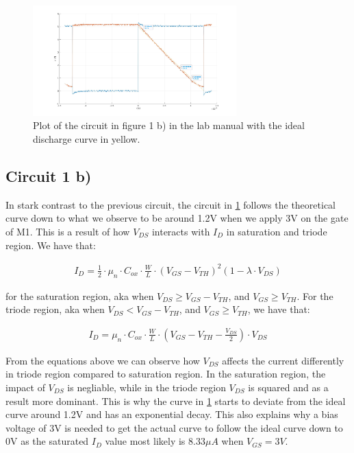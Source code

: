 \documentclass[onecolumn]{article}
\begin{document}
\clearpage

\begin{figure}[h!]
    \centering
    \includegraphics[width=0.7\textwidth]{1b.jpg}
    \caption{Plot of the circuit in figure 1 b) in the lab manual with the ideal discharge curve in yellow.}
    \label{fig:task1b}
\end{figure}


\subsection{Circuit 1 b)}
In stark contrast to the previous circuit, the circuit in \ref{fig:task1b} follows the theoretical curve down to what we observe to be around 1.2V when we apply 3V on the gate of M1. This is a result of how $V_{DS}$ interacts with $I_D$ in saturation and triode region. We have that:

\begin{align}
    I_D = \frac{1}{2} \cdot \mu_n \cdot C_{ox} \cdot \frac{W}{L} \cdot (V_{GS} - V_{TH})^2(1 - \lambda \cdot V_{DS})
\end{align}

for the saturation region, aka when $V_{DS} \geq V_{GS} - V_{TH}$, and $V_{GS} \geq V_{TH}$. For the triode region, aka when $V_{DS} < V_{GS} - V_{TH}$, and $V_{GS} \geq V_{TH}$, we have that:

\begin{align}
    I_D = \mu_n \cdot C_{ox} \cdot \frac{W}{L} \cdot (V_{GS} - V_{TH} - \frac{V_{DS}}{2}) \cdot V_{DS}
\end{align}

From the equations above we can observe how $V_{DS}$ affects the current differently in triode region compared to saturation region. In the saturation region, the impact of $V_{DS}$ is negliable, while in the triode region $V_{DS}$ is squared and as a result more dominant. This is why the curve in \ref{fig:task1b} starts to deviate from the ideal curve around 1.2V and has an exponential decay. This also explains why a bias voltage of 3V is needed to get the actual curve to follow the ideal curve down to 0V as the saturated $I_D$ value most likely is $8.33\mu A$ when $V_{GS} = 3V$.
\end{document}
